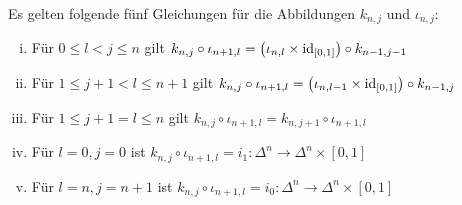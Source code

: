 \begin{lemma}[{name=[{Gleichungen für die Abbildungen aus \autoref{def:710}}]},label=lem:711]
	Es gelten folgende fünf Gleichungen für die Abbildungen $k_{n,j}$ und $\iota_{n,j}$:
	\begin{enumerate}[(i)]
		\item Für $0 \le l < j \le n$ gilt $k_{n,j} \circ \iota_{n+1,l} = \enbrace*{\iota_{n,l} \times \id_{[0,1]}} \circ k_{n-1,j-1}$
		\item Für $1 \le j+1 < l \le n+1$ gilt $k_{n,j} \circ \iota_{n+1,l} = \enbrace*{\iota_{n,l-1} \times \id_{[0,1]}} \circ k_{n-1,j} $
		\item Für $1 \le j+1 = l \le n$ gilt $k_{n,j} \circ \iota_{n+1,l} = k_{n,j+1} \circ \iota_{n+1,l}$
		\item Für $l=0,j=0$ ist $k_{n,j} \circ \iota_{n+1,l} = i_1 :  \Delta^n \to \Delta^n \times [0,1]$
		\item Für $l=n,j=n+1$ ist $k_{n,j} \circ \iota_{n+1,l} = i_0 : \Delta^n \to \Delta^n \times [0,1]$
	\end{enumerate}
\end{lemma}
